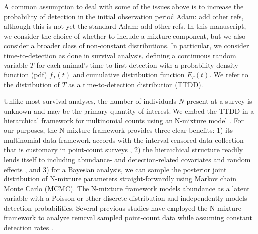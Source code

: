 \documentclass[useAMS,usenatbib,referee,12pt]{article}
\newcommand{\jarad}[1]{{\color{Orange} #1}}
\begin{document}
A common assumption to deal with some of the issues above is to increase the probability of detection in the initial observation period \citep{Etterson2009} \jarad{Adam: add other refs}, although this is not yet the standard \citep{Amundson2014} \jarad{Adam: add other refs}. 
In this manuscript, we consider the choice of whether to include a mixture component, but we also consider a broader class of non-constant distributions.
In particular, we consider time-to-detection as done in survival analysis, defining a continuous random variable $T$ for each animal's time to first detection with a probability density function (pdf) $f_T(t)$ and cumulative distribution function $F_T(t)$.  
We refer to the distribution of $T$ as a time-to-detection distribution (TTDD).  


Unlike most survival analyses, the number of individuals $N$ present at a survey is unknown and may be the primary quantity of interest.  
We embed the TTDD in a hierarchical framework for multinomial counts using an N-mixture model \citep{Wyatt2002, Royle2004NMixture}.  
For our purposes, the N-mixture framework provides three clear benefits: 1) its multinomial data framework accords with the interval censored data collection that is customary in point-count surveys \citep{Ralph1995}, 2) the hierarchical structure readily lends itself to including abundance- and detection-related covariates and random effects \citep{Dorazio2005, Etterson2009, Amundson2014}, and 3) for a Bayesian analysis, we can sample the posterior joint distribution of N-mixture parameters straight-forwardly using Markov chain Monte Carlo (MCMC).  
The N-mixture framework models abundance as a latent variable with a Poisson or other discrete distribution and independently models detection probabilities.  
Several previous studies have employed the N-mixture framework to analyze removal sampled point-count data while assuming constant detection rates \citep{Royle2004Generalized, Dorazio2005, Etterson2009, Solymos2013, Amundson2014}.  



\end{document}
